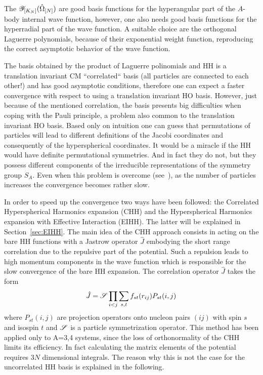 The ${\cal Y}_{[K_N]}(\hat\Omega_{[N]})$ are good  basis functions for the hyperangular part of the $A$-body internal 
wave function, however, one also needs good basis functions for the hyperradial part of the wave function.
A suitable choice are the orthogonal Laguerre polynomials, because of their exponential weight function, reproducing the 
correct asymptotic behavior of the wave function.

The basis obtained  by the product of Laguerre polinomials and HH is a translation invariant  CM ``correlated``  basis 
(all particles are connected to each other!) and
has good asymptotic conditions, therefore one can expect a faster convergence with respect to using a translation invariant HO basis. 
However, just because of the mentioned correlation, the basis presents big difficulties when coping with the Pauli
principle, a  problem also common to the translation invariant HO basis. 
Based only on intuition one can guess that permutations of particles will lead to different definitions 
of the Jacobi coordinates and consequently of the hyperspherical coordinates. It would be a miracle if the  HH would have 
definite permutational symmetries. And in fact they do not, but they possess different  components 
of the irreducible representations of the symmetry group $S_A$. Even when this problem is overcome 
(see~\cite{NOVOSELSKY:1994,BARNEA:1997+8, Gatto:2011,Deflorian:2013}), as the number of particles increases the convergence 
becomes rather slow.

In order to speed up the convergence two ways have been followed: the Correlated Hyperspherical Harmonics expansion (CHH)  and the 
Hyperspherical Harmonics expansion with Effective Interaction (EIHH). The latter will be explained in Section~\ref{sec:EIHH}. 
The main idea of the CHH approach consists in acting on the bare HH functions with a Jastrow
operator $\hat J$ embodying the short range correlation due to the repulsive part of the potential.
Such a repulsion leads to high momentum components in the wave function which is responsible for the 
slow convergence of the bare HH expansion. The correlation operator $\hat J$ takes the form
\begin{equation}
 \hat J={\cal S}\prod_{i<j}\sum_{s,t}f_{st}(r_{ij})P_{st}(i,j)
\end{equation}
where $P_{st}(i,j)$  are projection operators onto nucleon pairs $(ij)$ with spin $s$ and isospin $t$ and
${\cal S}$ is a particle symmetrization operator. This method has been applied only to A=3,4 systems, since the loss of orthonormality
of the CHH limits its efficiency. In fact calculating the matrix elements of the potential requires $3N$ dimensional integrals.
The reason why  this is not the case for the uncorrelated HH basis is explained in the following.

